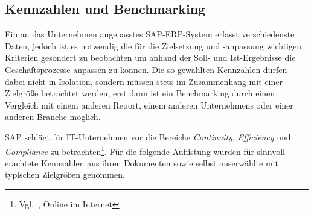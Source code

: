 \subsection{Kennzahlen und Benchmarking}

Ein an das Unternehmen angepasstes SAP-ERP-System erfasst
verschiedenste Daten, jedoch ist es notwendig die für die Zielsetzung
und -anpassung wichtigen Kriterien gesondert zu beobachten um anhand
der Soll- und Ist-Ergebnisse die Geschäftsprozesse anpassen zu
können.  Die so gewählten Kennzahlen dürfen dabei nicht in Isolation,
sondern müssen stets im Zusammenhang mit einer Zielgröße betrachtet
werden, erst dann ist ein Benchmarking durch einen Vergleich mit einem
anderen Report, einem anderen Unternehmens oder einer anderen Branche
möglich.

SAP schlägt für IT-Unternehmen vor die Bereiche \emph{Continuity},
\emph{Efficiency} und \emph{Compliance} zu
betrachten\footnote{Vgl.~\cite{SAP-Standard-IT-Service-Agreement},
  Online im Internet}.  Für die folgende Auflistung wurden für
sinnvoll erachtete Kennzahlen aus ihren Dokumenten sowie selbst
auserwählte mit typischen Zielgrößen genommen.

